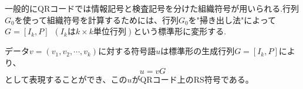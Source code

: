 \documentclass{thesis}
\begin{document}
一般的にQRコードでは情報記号と検査記号を分けた組織符号が用いられる.行列$G_0$を使って組織符号を計算するためには、行列$G_0$を"掃き出し法"によって$G=[I_k,P]$\
$(I_kはk\times k単位行列)$という標準形に変形する.

データ$v=(v_1,v_2,\cdots,v_k)$に対する符号語$u$は標準形の生成行列$G=[I_k,P]$により、
\begin{equation}
 u=vG
\end{equation}
として表現することができ、この$u$がQRコード上のRS符号である。













\end{document}
